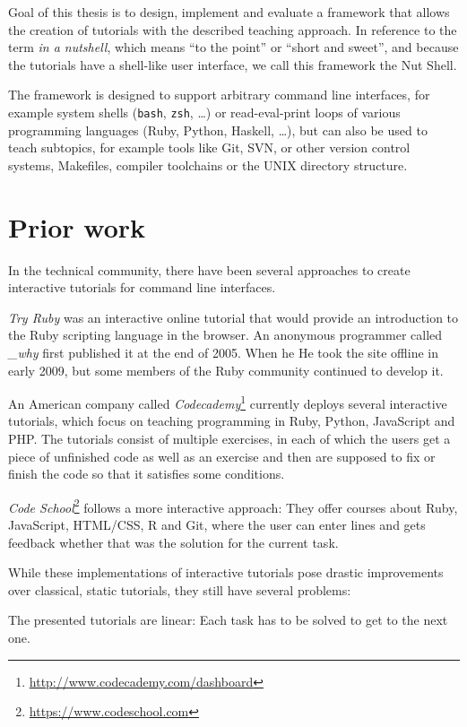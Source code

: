 \documentclass[paper=a4,twoside,abstract=on,cleardoublepage=empty,numbers=noenddot,toc=bib,11pt,appendixprefix=true]{scrreprt}
\begin{document}
Goal of this thesis is to design, implement and evaluate a framework that allows the creation of tutorials with the described teaching approach. In reference to the term \emph{in a nutshell}, which means “to the point” or “short and sweet”, and because the tutorials have a shell-like user interface, we call this framework the Nut Shell.

The framework is designed to support arbitrary command line interfaces, for example system shells (\texttt{bash}, \texttt{zsh}, …) or read-eval-print loops of various programming languages (Ruby, Python, Haskell, …), but can also be used to teach subtopics, for example tools like Git, SVN, or other version control systems, Makefiles, compiler toolchains or the UNIX directory structure.

\section{Prior work}

In the technical community, there have been several approaches to create interactive tutorials for command line interfaces.

\emph{Try Ruby} was an interactive online tutorial that would provide an introduction to the Ruby scripting language in the browser. An anonymous programmer called \emph{\_why} first published it at the end of 2005.\cite{tryrubydone} When he He took the site offline in early 2009, but some members of the Ruby community continued to develop it.

An American company called \emph{Codecademy}\footnote{\url{http://www.codecademy.com/dashboard}} currently deploys several interactive tutorials, which focus on teaching programming in Ruby, Python, JavaScript and PHP. The tutorials consist of multiple exercises, in each of which the users get a piece of unfinished code as well as an exercise and then are supposed to fix or finish the code so that it satisfies some conditions.

\emph{Code School}\footnote{\url{https://www.codeschool.com}} follows a more interactive approach: They offer courses about Ruby, JavaScript, HTML/CSS, R and Git, where the user can enter lines and gets feedback whether that was the solution for the current task.

While these implementations of interactive tutorials pose drastic improvements over classical, static tutorials, they still have several problems:

The presented tutorials are linear: Each task has to be solved to get to the next one.
\end{document}
